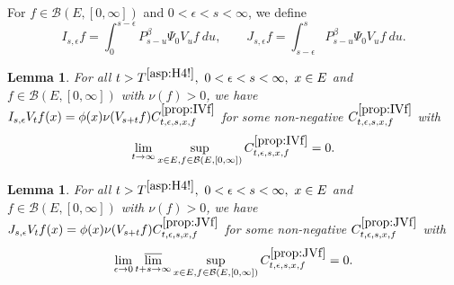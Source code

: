 \documentclass[12pt,a4paper]{amsart}
\numberwithin{equation}{section}
\theoremstyle{plain}
\newtheorem{lem}[thm]{Lemma}
\theoremstyle{definition}
\theoremstyle{remark}
\begin{document}
For $f\in \mathcal B(E,[0,\infty])$ and $0 < \epsilon < s < \infty$, we define
\begin{equation}
	I_{s,\epsilon} f
 	= \int_0^{s - \epsilon} P_{s - u}^\beta \Psi_0 V_u f ~du, \qquad
 	J_{s,\epsilon} f
 	= \int_{s-\epsilon}^s P_{s-u}^\beta \Psi_0 V_u f ~du.
\end{equation}
\begin{lem} \label{prop:IVf}
	For all $t> T^{\eqref{asp:H4!}},~0<\epsilon<s< \infty,~x\in E$ and $f\in \mathcal B(E,[0,\infty])$ with $\nu(f)>0$, we have $I_{s,\epsilon}V_t f(x) = \phi(x) \nu(V_{s+t} f) C^{\ref{prop:IVf}}_{t,\epsilon, s, x,f}$ for some non-negative $C^{\ref{prop:IVf}}_{t,\epsilon, s, x,f}$ with
\[
\lim_{t\to \infty} \sup_{x\in E, f\in \mathcal B(E,[0,\infty])}
C^{\ref{prop:IVf}}_{t,\epsilon, s, x,f} = 0.
\]
\end{lem}

\begin{lem} \label{prop:JVf}
For all $t>T^{\eqref{asp:H4!}},~0<\epsilon<s< \infty,~x\in E$ and $f\in \mathcal B(E,[0,\infty])$ with $\nu(f)>0$, we have $ J_{s,\epsilon} V_tf(x) = \phi(x) \nu(V_{s+t}f) C^{\ref{prop:JVf}}_{t,\epsilon,s,x,f}$ for some non-negative $C^{\ref{prop:JVf}}_{t,\epsilon,s,x,f}$ with
\[
\lim_{\epsilon \to 0}\varlimsup_{t+s\to \infty}
\sup_{x\in E, f\in \mathcal B(E,[0,\infty])}
C^{\ref{prop:JVf}}_{t,\epsilon,s,x,f} =0.
\]
\end{lem}
\end{document}
